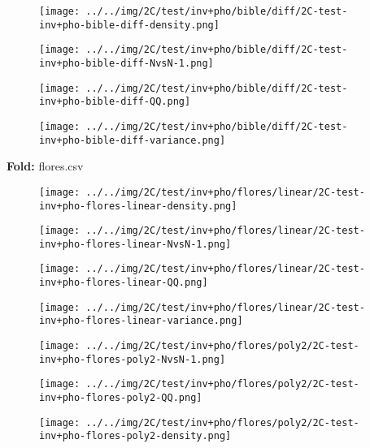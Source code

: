 \begin{figure}[H]
\centering	\texttt{[image: ../../img/2C/test/inv+pho/bible/diff/2C-test-inv+pho-bible-diff-density.png]}
\end{figure}
\begin{figure}[H]
\centering	\texttt{[image: ../../img/2C/test/inv+pho/bible/diff/2C-test-inv+pho-bible-diff-NvsN-1.png]}
\end{figure}
\begin{figure}[H]
\centering	\texttt{[image: ../../img/2C/test/inv+pho/bible/diff/2C-test-inv+pho-bible-diff-QQ.png]}
\end{figure}
\begin{figure}[H]
\centering	\texttt{[image: ../../img/2C/test/inv+pho/bible/diff/2C-test-inv+pho-bible-diff-variance.png]}
\end{figure}
\textbf{Fold:} flores.csv
\begin{figure}[H]
\centering	\texttt{[image: ../../img/2C/test/inv+pho/flores/linear/2C-test-inv+pho-flores-linear-density.png]}
\end{figure}
\begin{figure}[H]
\centering	\texttt{[image: ../../img/2C/test/inv+pho/flores/linear/2C-test-inv+pho-flores-linear-NvsN-1.png]}
\end{figure}
\begin{figure}[H]
\centering	\texttt{[image: ../../img/2C/test/inv+pho/flores/linear/2C-test-inv+pho-flores-linear-QQ.png]}
\end{figure}
\begin{figure}[H]
\centering	\texttt{[image: ../../img/2C/test/inv+pho/flores/linear/2C-test-inv+pho-flores-linear-variance.png]}
\end{figure}
\begin{figure}[H]
\centering	\texttt{[image: ../../img/2C/test/inv+pho/flores/poly2/2C-test-inv+pho-flores-poly2-NvsN-1.png]}
\end{figure}
\begin{figure}[H]
\centering	\texttt{[image: ../../img/2C/test/inv+pho/flores/poly2/2C-test-inv+pho-flores-poly2-QQ.png]}
\end{figure}
\begin{figure}[H]
\centering	\texttt{[image: ../../img/2C/test/inv+pho/flores/poly2/2C-test-inv+pho-flores-poly2-density.png]}
\end{figure}
